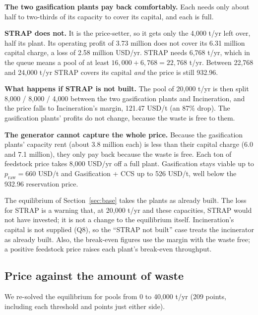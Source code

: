 \documentclass[11pt]{article}
\newcommand{\usd}{USD}
\begin{document}
\begin{readbox}
\textbf{The two gasification plants pay back comfortably.} Each needs only about
half to two-thirds of its capacity to cover its capital, and each is full.

\textbf{STRAP does not.} It is the price-setter, so it gets only the 4{,}000 t/yr
left over, half its plant. Its operating profit of 3.73 million does not cover its
6.31 million capital charge, a loss of 2.58 million \usd/yr. STRAP needs 6{,}768 t/yr,
which in the queue means a pool of at least $16{,}000+6{,}768=22{,}768$ t/yr. Between
22{,}768 and 24{,}000 t/yr STRAP covers its capital \emph{and} the price is still
932.96.

\textbf{What happens if STRAP is not built.} The pool of 20{,}000 t/yr is then split
8{,}000 / 8{,}000 / 4{,}000 between the two gasification plants and Incineration, and
the price falls to Incineration's margin, 121.47 \usd/t (an 87\% drop). The
gasification plants' profits do not change, because the waste is free to them.

\textbf{The generator cannot capture the whole price.} Because the gasification
plants' capacity rent (about 3.8 million each) is less than their capital charge
(6.0 and 7.1 million), they only pay back because the waste is free. Each ton of
feedstock price takes 8{,}000 \usd/yr off a full plant. Gasification stays viable up
to $p_{\mathrm{raw}}=660$ \usd/t and Gasification + CCS up to 526 \usd/t, well below
the 932.96 reservation price.
\end{readbox}

\begin{cautionbox}[title={How to read this}]
The equilibrium of Section~\ref{sec:base} takes the plants as already built. The loss
for STRAP is a warning that, at 20{,}000 t/yr and these capacities, STRAP would not
have invested; it is not a change to the equilibrium itself. Incineration's capital is
not supplied (Q8), so the ``STRAP not built'' case treats the incinerator as already
built. Also, the break-even figures use the margin with the waste free; a positive
feedstock price raises each plant's break-even throughput.
\end{cautionbox}

\subsection{Price against the amount of waste}
\label{sec:sweep}

We re-solved the equilibrium for pools from 0 to 40{,}000 t/yr (209 points,
including each threshold and points just either side).
\end{document}
